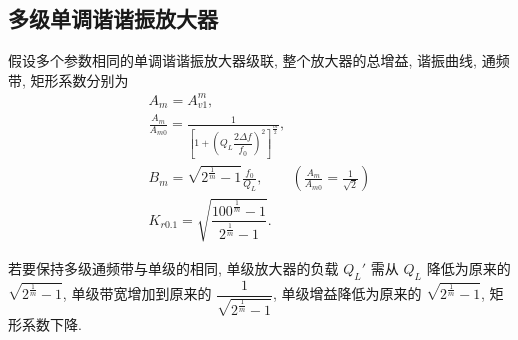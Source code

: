 \subsection{多级单调谐谐振放大器} \label{3 多级单调谐谐振放大器}

假设多个参数相同的单调谐谐振放大器级联, 整个放大器的总增益, 谐振曲线, 通频带, 矩形系数分别为
\begin{gather}
    A_m=A_{v1}^m, \\
    \frac{A_m}{A_{m0}}=\frac{1}{\left[1+\left(Q_L\dfrac{2\Delta f}{f_0}\right)^2\right]^\frac{m}{2}}, \\
    B_m=\sqrt{2^\frac{1}{m}-1}\frac{f_0}{Q_L}, \qquad \left(\frac{A_m}{A_{m0}}=\frac{1}{\sqrt{2}}\right) \\
    K_{r0.1}=\sqrt{\dfrac{100^\frac{1}{m}-1}{2^\frac{1}{m}-1}}.
\end{gather}

若要保持多级通频带与单级的相同, 单级放大器的负载 $Q_L'$ 需从 $Q_L$ 降低为原来的 $\sqrt{2^{\frac{1}{m}}-1}$, 单级带宽增加到原来的 $\dfrac{1}{\sqrt{2^{\frac{1}{m}}-1}}$, 单级增益降低为原来的 $\sqrt{2^{\frac{1}{m}}-1}$, 矩形系数下降.
